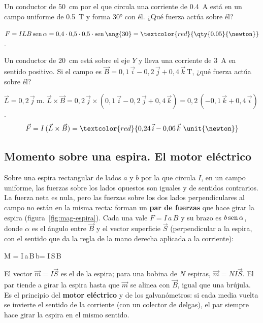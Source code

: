 \begin{exercise}
    Un conductor de \qty{50}{\cm} por el que circula una corriente de \qty{0.4}{\ampere} está en un campo uniforme de
    \qty{0.5}{\tesla} y forma \ang{30} con él. ¿Qué fuerza actúa sobre él?
    \begin{solu}
        \(F = I L B\sen\alpha = 0{,}4\cdot 0{,}5\cdot 0{,}5\cdot\sen\ang{30} = \textcolor{red}{\qty{0.05}{\newton}}\).
    \end{solu}
\end{exercise}

\begin{exercise}
    Un conductor de \qty{20}{\cm} está sobre el eje \(Y\) y lleva una corriente de \qty{3}{\ampere} en sentido positivo. Si el
    campo es \(\vec B = 0{,}1\,\vec{i} - 0{,}2\,\vec{j} + 0{,}4\,\vec{k}\ \unit{\tesla}\), ¿qué fuerza actúa sobre él?
    \begin{solu}
        \(\vec L = 0{,}2\,\vec{j}\ \unit{\m}\).
        \(\vec L\times\vec B = 0{,}2\,\vec{j}\times(0{,}1\,\vec{i} - 0{,}2\,\vec{j} + 0{,}4\,\vec{k}) = 0{,}2\,(-0{,}1\,\vec{k} + 0{,}4\,\vec{i})\).
        \[ \vec F = I\,(\vec L\times\vec B) = \textcolor{red}{0{,}24\,\vec{i} - 0{,}06\,\vec{k}\ \unit{\newton}} \]
    \end{solu}
\end{exercise}

\subsection{Momento sobre una espira. El motor eléctrico}\label{subsec:mag-espira}

Sobre una espira rectangular de lados \(a\) y \(b\) por la que circula \(I\), en un campo uniforme, las fuerzas sobre los lados
opuestos son iguales y de sentidos contrarios. La fuerza neta es nula, pero las fuerzas sobre los dos lados perpendiculares al
campo no están en la misma recta: forman un \textbf{par de fuerzas} que hace girar la espira (figura~\ref{fig:mag-espira}). Cada
una vale \(F = I\,a\,B\) y su brazo es \(b\operatorname{sen}\alpha\), donde \(\alpha\) es el ángulo entre \(\vec B\) y el vector superficie
\(\vec S\) (perpendicular a la espira, con el sentido que da la regla de la mano derecha aplicada a la corriente):
\begin{centeredequation}
    M = I\,a\,B\,b\sen\alpha = I\,S\,B\sen\alpha \qquad\Rightarrow\qquad {} \label{eq:mag-par}
\end{centeredequation}
El vector \(\vec m = I\vec S\) es el  de la espira; para una bobina de \(N\) espiras, \(\vec m = N I\vec S\).
El par tiende a girar la espira hasta que \(\vec m\) se alinea con \(\vec B\), igual que una brújula. Es el principio del
\textbf{motor eléctrico} y de los galvanómetros: si cada media vuelta se invierte el sentido de la corriente (con un colector de
delgas), el par siempre hace girar la espira en el mismo sentido.

